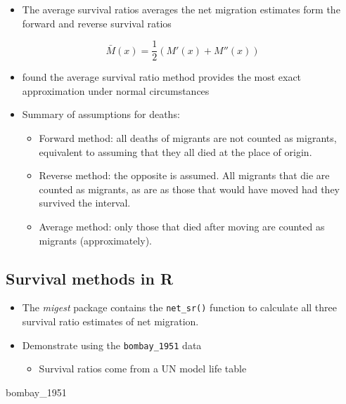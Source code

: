 \documentclass[
]{book}
\newenvironment{Shaded}{\begin{snugshade}}{\end{snugshade}}
\newcommand{\NormalTok}[1]{#1}
\providecommand{\tightlist}{%
  \setlength{\itemsep}{0pt}\setlength{\parskip}{0pt}}
\begin{document}
\begin{itemize}
\tightlist
\item
  The average survival ratios averages the net migration estimates form the forward and reverse survival ratios
\end{itemize}

\[
\bar{M}(x) = \frac{1}{2}(M'(x) + M''(x) )
\]

\begin{itemize}
\tightlist
\item
  \citet{Siegel1952} found the average survival ratio method provides the most exact approximation under normal circumstances
\item
  Summary of assumptions for deaths:

  \begin{itemize}
  \tightlist
  \item
    Forward method: all deaths of migrants are not counted as migrants, equivalent to assuming that they all died at the place of origin.
  \item
    Reverse method: the opposite is assumed. All migrants that die are counted as migrants, as are as those that would have moved had they survived the interval.
  \item
    Average method: only those that died after moving are counted as migrants (approximately).
  \end{itemize}
\end{itemize}

\hypertarget{survival-methods-in-r}{%
\subsection{Survival methods in R}\label{survival-methods-in-r}}

\begin{itemize}
\tightlist
\item
  The \emph{migest} package contains the \texttt{net\_sr()} function to calculate all three survival ratio estimates of net migration.
\item
  Demonstrate using the \texttt{bombay\_1951} data

  \begin{itemize}
  \tightlist
  \item
    Survival ratios come from a UN model life table
  \end{itemize}
\end{itemize}

\begin{Shaded}
\begin{Highlighting}[]
\NormalTok{bombay\_1951}
\end{Highlighting}
\end{Shaded}
\end{document}
